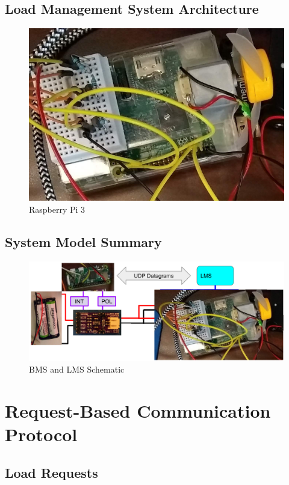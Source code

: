 \documentclass[11pt,conference,draftcls,onecolumn]{IEEEtran}
\begin{document}
\subsection{Load Management System Architecture}
\begin{figure}
    \centering
    \includegraphics[width=6.5in]{img/rpi3.png}
    \caption{Raspberry Pi 3}
    \label{fig:rpi3}
\end{figure}

\subsection{System Model Summary}

\begin{figure}
    \centering
    \includegraphics[width=6.5in]{img/uBmsModelPics.png}
    \caption{BMS and LMS Schematic}
    \label{fig:bmsModelPics}
\end{figure}

\section{Request-Based Communication Protocol}\label{sec:rbComm}
\subsection{Load Requests}
\end{document}
